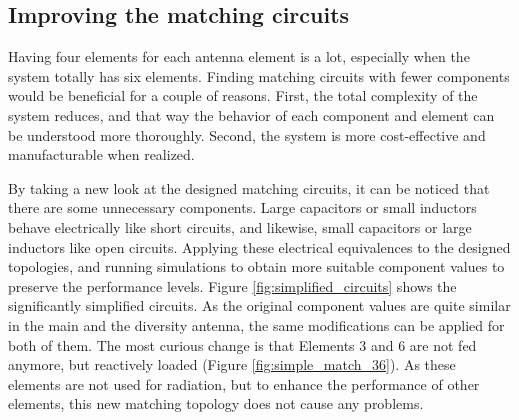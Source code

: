\subsection{Improving the matching circuits}
\label{sec:matching_circuit}

Having four elements for each antenna element is a lot, especially when the system totally has six elements. Finding matching circuits with fewer components would be beneficial for a couple of reasons. First, the total complexity of the system reduces, and that way the behavior of each component and element can be understood more thoroughly. Second, the system is more cost-effective and manufacturable when realized. 

By taking a new look at the designed matching circuits, it can be noticed that there are some unnecessary components. Large capacitors or small inductors behave electrically like short circuits, and likewise, small capacitors or large inductors like open circuits. Applying these electrical equivalences to the designed topologies, and running simulations to obtain more suitable component values to preserve the performance levels. Figure \ref{fig:simplified_circuits} shows the significantly simplified circuits. As the original component values are quite similar in the main and the diversity antenna, the same modifications can be applied for both of them. The most curious change is that Elements 3 and 6 are not fed anymore, but reactively loaded (Figure \ref{fig:simple_match_36}). As these elements are not used for radiation, but to enhance the performance of other elements, this new matching topology does not cause any problems. 


